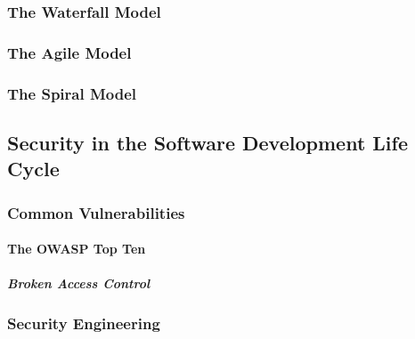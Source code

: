 \subsubsection{The Waterfall Model}

\subsubsection{The Agile Model}

\subsubsection{The Spiral Model}

\subsection{Security in the Software Development Life Cycle}

\subsubsection{Common Vulnerabilities}

\paragraph{The OWASP Top Ten}

\subparagraph{Broken Access Control} 

\subsubsection{Security Engineering}




